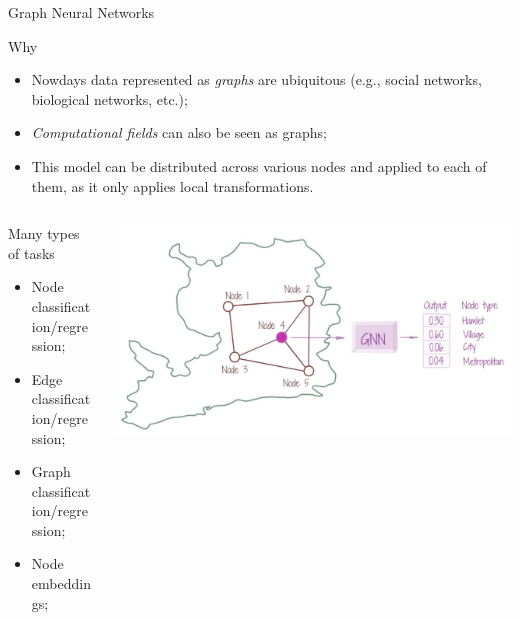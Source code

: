 \documentclass[presentation]{beamer}\mode<presentation>{\usetheme{AMSBolognaFC}}
\begin{document}
\begin{frame}[allowframebreaks]{Graph Neural Networks}

\begin{block}{Why}
	\begin{itemize}
		\item Nowdays data represented as \emph{graphs} are ubiquitous 
			(e.g., social networks, biological networks, etc.);
		\item \emph{Computational fields} can also be seen as graphs;
		\item This model can be distributed across various nodes and applied to each of them, 
			as it only applies local transformations.
	\end{itemize}
\end{block}

\begin{columns}
	\begin{column}{0.5\textwidth}
		\begin{alertblock}{Many types of tasks}
			\begin{itemize}
				\item Node classification/regression;
				\item Edge classification/regression;
				\item Graph classification/regression;
				\item Node embeddings;
			\end{itemize}
		\end{alertblock}
	\end{column}
	\begin{column}{0.5\textwidth}
		\includegraphics[width=\textwidth]{img/gnn.png}
	\end{column}
\end{columns}



\end{frame}
\end{document}
